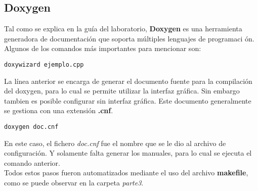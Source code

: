 \documentclass{article}
\begin{document}
\subsection*{Doxygen}
Tal como se explica en la gu\' ia del laboratorio, \textbf{Doxygen} es una herramienta generadora de documentaci\' on que soporta m\' ultiples lenguajes de programaci \'on.\\
\bigskip
Algunos de los comandos m\' as importantes para mencionar son:
\begin{verbatim}
doxywizard ejemplo.cpp
\end{verbatim}
La l\' inea anterior se encarga de generar el documento fuente para la compilaci\' on del doxygen, para lo cual se permite utilizar la interfaz gr\' afica. Sin embargo tambien es posible configurar sin interfaz gr\' afica. Este documento generalmente se gestiona con una extensi\' on \textbf{.cnf}.\\
\bigskip
\begin{verbatim}
doxygen doc.cnf
\end{verbatim}
En este caso, el fichero \textit{doc.cnf} fue el nombre que se le dio al archivo de configuraci\' on. Y solamente falta generar los manuales, para lo cual se ejecuta el comando anterior.\\
\bigskip
Todos estos pasos fueron automatizados mediante el uso del archivo \textbf{makefile}, como se puede observar en la carpeta \textit{parte3}.
\end{document}
